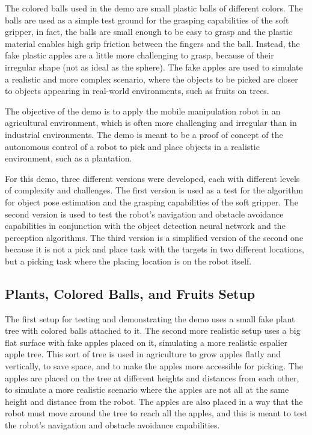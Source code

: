 The colored balls used in the demo are small plastic balls of different colors. The balls are used as a simple
test ground for the grasping capabilities of the soft gripper, in fact, the balls are small enough to be easy to grasp
and the plastic material enables high grip friction between the fingers and the ball. Instead, the fake plastic apples
are a little more challenging to grasp, because of their irregular shape (not as ideal as the sphere).
The fake apples are used to simulate a realistic and more complex scenario, where the objects to be picked are
closer to objects appearing in real-world environments, such as fruits on trees.

The objective of the demo is to apply the mobile manipulation robot in an agricultural environment, which is
often more challenging and irregular than in industrial environments. The demo is meant to be a proof of concept
of the autonomous control of a robot to pick and place objects in a realistic environment, such as a plantation.

For this demo, three different versions were developed, each with different levels of complexity and challenges.
The first version is used as a test for the algorithm for object pose estimation and the grasping capabilities
of the soft gripper. The second version is used to test the robot's navigation and obstacle avoidance capabilities
in conjunction with the object detection neural network and the perception algorithms. The third version is a 
simplified version of the second one because it is not a pick and place task with the targets in two different
locations, but a picking task where the placing location is on the robot itself.


\subsection{Plants, Colored Balls, and Fruits Setup}

The first setup for testing and demonstrating the demo uses a small fake plant tree with colored balls attached to it.
The second more realistic setup uses a big flat surface with fake apples placed on it, simulating a more realistic
espalier apple tree. This sort of tree is used in agriculture to grow apples flatly and vertically, to save space,
and to make the apples more accessible for picking. The apples are placed on the tree at different heights and distances
from each other, to simulate a more realistic scenario where the apples are not all at the same height and distance
from the robot. The apples are also placed in a way that the robot must move around the tree to reach all the apples,
and this is meant to test the robot's navigation and obstacle avoidance capabilities.

